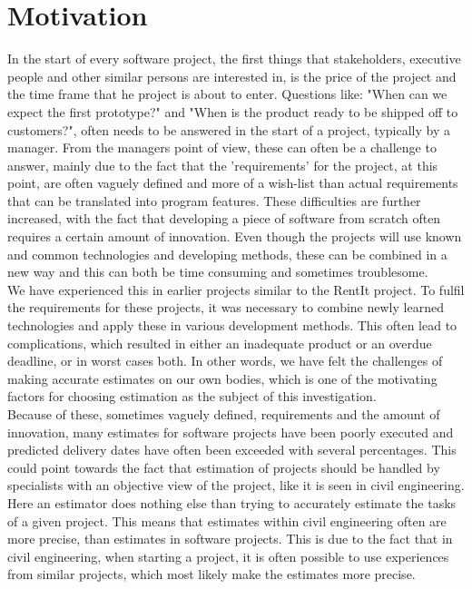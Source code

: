 \section{Motivation}
In the start of every software project, the first things that stakeholders, executive people and other similar persons are interested in, is the price of the project and the time frame that he project is about to enter. Questions like: "When can we expect the first prototype?" and "When is the product ready to be shipped off to customers?", often needs to be answered in the start of a project, typically by a manager. From the managers point of view, these can often be a challenge to answer, mainly due to the fact that the 'requirements' for the project, at this point, are often vaguely defined and more of a wish-list than actual requirements that can be translated into program features. These difficulties are further increased, with the fact that developing a piece of software from scratch often requires a certain amount of innovation\cite[p.139]{ProjectManagement_b}. Even though the projects will use known and common technologies and developing methods, these can be combined in a new way and this can both be time consuming and sometimes troublesome.\\ We have experienced this in earlier projects similar to the RentIt project. To fulfil the requirements for these projects, it was necessary to combine newly learned technologies and apply these in various development methods. This often lead to  complications, which resulted in either an inadequate product or an overdue deadline, or in worst cases both. In other words, we have felt the challenges of making accurate estimates on our own bodies, which is one of the motivating factors for choosing estimation as the subject of this investigation.\\


Because of these, sometimes vaguely defined, requirements and the amount of innovation, many estimates for software projects have been poorly executed and predicted delivery dates have often been exceeded with several percentages. This could point towards the fact that estimation of projects should be handled by specialists with an objective view of the project, like it is seen in civil engineering. Here an estimator does nothing else than trying to accurately estimate the tasks of a given project\cite[p.140]{ProjectManagement_b}. This means that estimates within civil engineering often are more precise, than estimates in software projects. This is due to the fact that in civil engineering, when starting a project, it is often possible to use experiences from similar projects, which most likely make the estimates more precise. \\

